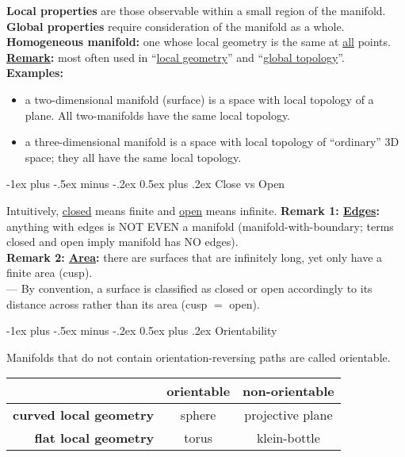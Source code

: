 \documentclass[10pt,landscape]{article}
\makeatletter
\renewcommand{\section}{\@startsection{section}{1}{0mm}%
                                {-1ex plus -.5ex minus -.2ex}%
                                {0.5ex plus .2ex}%
                                {\normalfont\large\bfseries}}
\makeatother
\begin{document}
\begin{multicols}{3}
{\bf Local properties} are those observable within a small region of the
manifold.\\
{\bf Global properties} require consideration of the manifold as a whole.\\
{\bf Homogeneous manifold:} one whose local geometry is the same at
\underline{all} points.\\
{\bf \underline{Remark}:} most often used in ``\underline{local geometry}'' and
``\underline{global topology}''.\\
{\bf Examples:}
\begin{itemize}
\item a two-dimensional manifold (surface) is a space with local topology of a
  plane. All two-manifolds have the same local topology.
\item a three-dimensional manifold is a space with local topology of
  ``ordinary'' 3D space; they all have the same local topology.
\end{itemize}


\section{Close vs Open}

Intuitively, \underline{closed} means finite and \underline{open} means
infinite.
{\bf Remark 1: \underline{Edges}:} anything with edges is NOT EVEN a manifold
(manifold-with-boundary; terms closed and open imply manifold has NO edges).\\
{\bf Remark 2: \underline{Area}:} there are surfaces that are infinitely long,
yet only have a finite area (cusp).\\
--- By convention, a surface is classified as closed or open accordingly to its
distance across rather than its area (cusp $=$ open).


\section{Orientability}

Manifolds that do not contain orientation-reversing paths are called orientable.
\begin{center}
  \begin{tabular}{r|c|c}
    & {\bf orientable} & {\bf non-orientable} \\\hline
    {\bf curved local geometry} & sphere & projective plane \\\hline
    {\bf flat local geometry} & torus & klein-bottle \\\hline
  \end{tabular}
\end{center}










\clearpage


\end{multicols}
\end{document}
